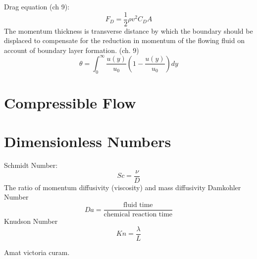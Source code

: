 \documentclass{article}
\begin{document}
Drag equation (ch 9): 
\begin{equation}
  F_D = \frac{1}{2}\rho v^2 C_D A
\end{equation}
\newline
\newline
The momentum thickness is transverse distance by which the boundary should be displaced to compensate for the reduction in momentum of the flowing fluid on account of boundary layer formation. (ch. 9)
\begin{equation}
  \theta = \int^\infty_0 \frac{u(y)}{u_0}(1-\frac{u(y)}{u_0})dy
\end{equation}
\newline
\newline


%
%
\newpage
\section{Compressible Flow}



%
%
\newpage
\section{Dimensionless Numbers}
Schmidt Number:
\begin{equation}
  Sc = \frac{\nu}{D}
\end{equation}
The ratio of momentum diffusivity (viscosity) and mass diffusivity
\newline
\newline
Damkohler Number
\begin{equation}
  Da = \frac{\textrm{fluid time}}{\textrm{chemical reaction time}}
\end{equation}
\newline
\newline
Knudson Number
\begin{equation}
  Kn = \frac{\lambda}{L}
\end{equation}

\newpage
Amat victoria curam. 
\end{document}
